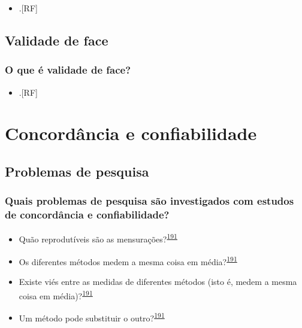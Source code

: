 \documentclass[
  a4paper,
]{book}
\providecommand{\tightlist}{%
  \setlength{\itemsep}{0pt}\setlength{\parskip}{0pt}}
\begin{document}
\begin{itemize}
\tightlist
\item
  .{[}RF{]}
\end{itemize}

\hypertarget{validade-face}{%
\section{Validade de face}\label{validade-face}}

\hypertarget{o-que-uxe9-validade-de-face}{%
\subsection{O que é validade de face?}\label{o-que-uxe9-validade-de-face}}

\begin{itemize}
\tightlist
\item
  .{[}RF{]}
\end{itemize}

\hypertarget{analise-concordancia-confiabilidade}{%
\chapter{\texorpdfstring{\textbf{Concordância e confiabilidade}}{Concordância e confiabilidade}}\label{analise-concordancia-confiabilidade}}

\hypertarget{problemas}{%
\section{Problemas de pesquisa}\label{problemas}}

\hypertarget{quais-problemas-de-pesquisa-suxe3o-investigados-com-estudos-de-concorduxe2ncia-e-confiabilidade}{%
\subsection{Quais problemas de pesquisa são investigados com estudos de concordância e confiabilidade?}\label{quais-problemas-de-pesquisa-suxe3o-investigados-com-estudos-de-concorduxe2ncia-e-confiabilidade}}

\begin{itemize}
\item
  Quão reprodutíveis são as mensurações?\textsuperscript{\protect\hyperlink{ref-altman1983}{191}}
\item
  Os diferentes métodos medem a mesma coisa em média?\textsuperscript{\protect\hyperlink{ref-altman1983}{191}}
\item
  Existe viés entre as medidas de diferentes métodos (isto é, medem a mesma coisa em média)?\textsuperscript{\protect\hyperlink{ref-altman1983}{191}}
\item
  Um método pode substituir o outro?\textsuperscript{\protect\hyperlink{ref-altman1983}{191}}
\end{itemize}
\end{document}

